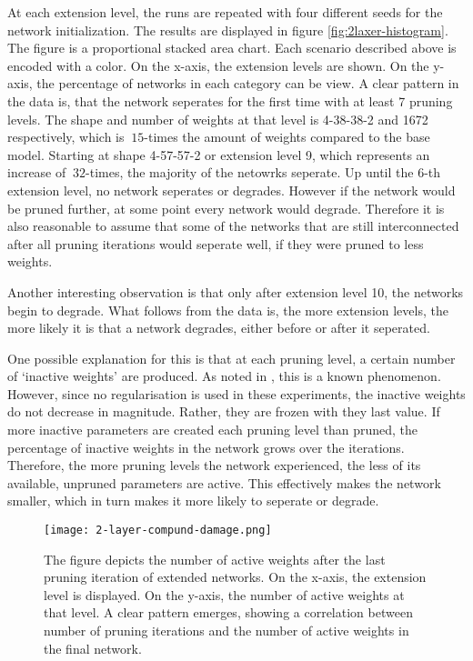 At each extension level, the runs are repeated with four different seeds for the network initialization.
The results are displayed in figure \ref{fig:2laxer-histogram}.
The figure is a proportional stacked area chart.
Each scenario described above is encoded with a color.
On the x-axis, the extension levels are shown.
On the y-axis, the percentage of networks in each category can be view.
A clear pattern in the data is, that the network seperates for the first time with at least 7 pruning levels.
The shape and number of weights at that level is 4-38-38-2 and 1672 respectively, which is $~15$-times the amount of weights compared to the base model. 
Starting at shape 4-57-57-2 or extension level 9, which represents an increase of $~32$-times, the majority of the netowrks seperate.
Up until the 6-th extension level, no network seperates or degrades. 
However if the network would be pruned further, at some point every network would degrade.
Therefore it is also reasonable to assume that some of the networks that are still interconnected after all pruning iterations would seperate well, if they were pruned to less weights.

Another interesting observation is that only after extension level 10, the networks begin to degrade.
What follows from the data is, the more extension levels, the more likely it is that a network degrades, either before or after it seperated.

One possible explanation for this is that at each pruning level, a certain number of `inactive weights' are produced.
As noted in \autocite{HanEtAl15, AllAlivePruning}, this is a known phenomenon.
However, since no regularisation is used in these experiments, the inactive weights do not decrease in magnitude.
Rather, they are frozen with they last value.
If more inactive parameters are created each pruning level than pruned, the percentage of inactive weights in the network grows over the iterations.
Therefore, the more pruning levels the network experienced, the less of its available, unpruned parameters are active.
This effectively makes the network smaller, which in turn makes it more likely to seperate or degrade.

\begin{figure}[ht]
    \centering
    \texttt{[image: 2-layer-compund-damage.png]}
    \caption{
        The figure depicts the number of active weights after the last pruning iteration of extended networks.
        On the x-axis, the extension level is displayed.
        On the y-axis, the number of active weights at that level.
        A clear pattern emerges, showing a correlation between number of pruning iterations and the number of active weights in the final network.
    }
    \label{fig:collateral_damage}
\end{figure}

